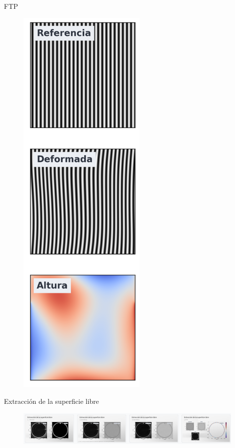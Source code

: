\documentclass[aspectratio=169]{beamer}
\begin{document}
\begin{frame}{FTP}
\begin{minipage}{0.29\textwidth}
\begin{figure}
	    \includegraphics[width=0.56\textwidth]{figs/synthetic_ftp.png}
	  \end{figure}
	\end{minipage}
\end{frame}

\begin{frame}{Extracción de la superficie libre} %
	\begin{figure}[ht]
		\centering
		\includegraphics[width=1\textwidth]{figs/ss4.png}
	\end{figure}
\end{frame}
\end{document}
